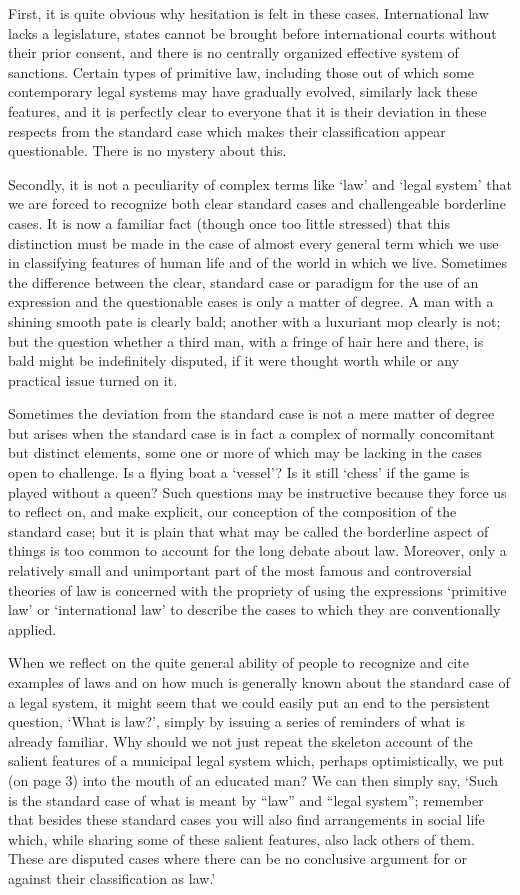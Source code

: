 First, it is quite obvious why hesitation is felt in these cases.
International law lacks a legislature, states cannot be brought before
international courts without their prior consent, and there is no
centrally organized effective system of sanctions. Certain types of
primitive law, including those out of which some contemporary legal
systems may have gradually evolved, similarly lack these features, and
it is perfectly clear to everyone that it is their deviation in these
respects from the standard case which makes their classification appear
questionable. There is no mystery about this.

Secondly, it is not a peculiarity of complex terms like `law' and `legal
system' that we are forced to recognize both clear standard cases and
challengeable borderline cases. It is now a familiar fact (though once
too little stressed) that this distinction must be made in the case of
almost every general term which we use in classifying features of human
life and of the world in which we live. Sometimes the difference between
the clear, standard case or paradigm for the use of an expression and
the questionable cases is only a matter of degree. A man with a shining
smooth pate is clearly bald; another with a luxuriant mop clearly is
not; but the question whether a third man, with a fringe of hair here
and there, is bald might be indefinitely disputed, if it were thought
worth while or any practical issue turned on it.

Sometimes the deviation from the standard case is not a mere matter of
degree but arises when the standard case is in fact a complex of
normally concomitant but distinct elements, some one or more of which
may be lacking in the cases open to challenge. Is a flying boat a
`vessel'? Is it still `chess' if the game is played without a queen?
Such questions may be instructive because they force us to reflect on,
and make explicit, our conception of the composition of the standard
case; but it is plain that what may be called the borderline aspect of
things is too common to account for the long debate about law. Moreover,
only a relatively small and unimportant part of the most famous and
controversial theories of law is concerned with the propriety of using
the expressions `primitive law' or `international law' to describe the
cases to which they are conventionally applied.

When we reflect on the quite general ability of people to recognize and
cite examples of laws and on how much is generally known about the
standard case of a legal system, it might seem that we could easily put
an end to the persistent question, `What is law?', simply by issuing a
series of reminders of what is already familiar. Why should we not just
repeat the skeleton account of the salient features of a municipal legal
system which, perhaps optimistically, we put (on page 3) into the mouth
of an educated man? We can then simply say, `Such is the standard case
of what is meant by ``law'' and ``legal system''; remember that besides
these standard cases you will also find arrangements in social life
which, while sharing some of these salient features, also lack others of
them. These are disputed cases where there can be no conclusive argument
for or against their classification as law.'

